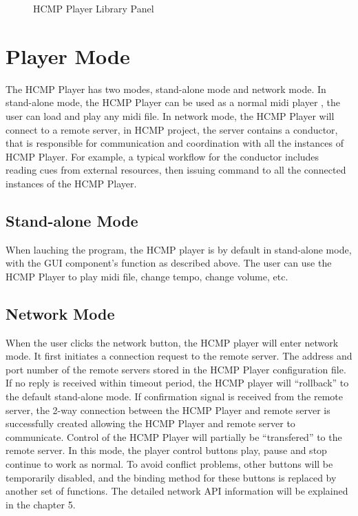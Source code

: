 \begin{figure}[H]
\caption{HCMP Player Library Panel}
\label{fig:speciation}
\end{figure}

\section{Player Mode}

The HCMP Player has two modes, stand-alone mode and network mode. 
In stand-alone mode, the HCMP Player can be used as a normal midi player 
, the user can load and play any midi file. In network mode, 
the HCMP Player will connect to a remote 
server, in HCMP project, the server contains a conductor, that 
is responsible for communication and coordination with all the 
instances of HCMP Player. For example, 
a typical workflow for the conductor includes reading cues from external resources, 
then issuing command to all the connected instances of the HCMP Player.

\subsection{Stand-alone Mode}

When lauching the program, the HCMP player is by default in stand-alone mode, 
with the GUI component's function as described above. 
The user can use the HCMP Player to play midi file, change tempo, change volume, etc.


\subsection{Network Mode}

When the user clicks the network button, 
the HCMP player will enter
network mode. It first initiates a connection request 
to the remote server. The address and port number of the remote servers 
stored in the HCMP Player configuration file. If no reply is received within
timeout period, the HCMP player will ``rollback'' to the default stand-alone mode.
If confirmation signal is received from the
remote server, the 2-way connection between the HCMP Player and 
remote server is successfully created allowing the HCMP Player and 
remote server to communicate. Control of the HCMP 
Player will partially be ``transfered'' to the remote server. 
In this mode, the player control buttons play, pause   
and stop continue to work as normal. To avoid conflict problems, other buttons will 
be temporarily disabled, and the binding method for these buttons is replaced by
another set of functions. The detailed network API information will be explained  
in the chapter 5.
